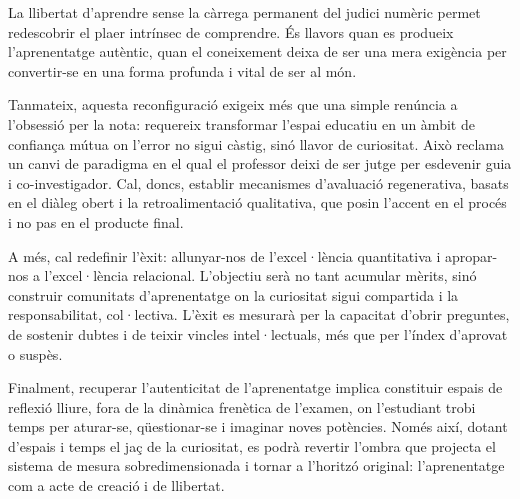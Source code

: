 La llibertat d’aprendre sense la càrrega permanent del judici numèric permet redescobrir el plaer intrínsec de comprendre. És llavors quan es produeix l’aprenentatge autèntic, quan el coneixement deixa de ser una mera exigència per convertir-se en una forma profunda i vital de ser al món.

Tanmateix, aquesta reconfiguració exigeix més que una simple renúncia a l’obsessió per la nota: requereix transformar l’espai educatiu en un àmbit de confiança mútua on l’error no sigui càstig, sinó llavor de curiositat. Això reclama un canvi de paradigma en el qual el professor deixi de ser jutge per esdevenir guia i co-investigador. Cal, doncs, establir mecanismes d’avaluació regenerativa, basats en el diàleg obert i la retroalimentació qualitativa, que posin l’accent en el procés i no pas en el producte final.

A més, cal redefinir l’èxit: allunyar-nos de l’excel·lència quantitativa i apropar-nos a l’excel·lència relacional. L’objectiu serà no tant acumular mèrits, sinó construir comunitats d’aprenentatge on la curiositat sigui compartida i la responsabilitat, col·lectiva. L’èxit es mesurarà per la capacitat d’obrir preguntes, de sostenir dubtes i de teixir vincles intel·lectuals, més que per l’índex d’aprovat o suspès.

Finalment, recuperar l’autenticitat de l’aprenentatge implica constituir espais de reflexió lliure, fora de la dinàmica frenètica de l’examen, on l’estudiant trobi temps per aturar-se, qüestionar-se i imaginar noves potències. Només així, dotant d’espais i temps el jaç de la curiositat, es podrà revertir l’ombra que projecta el sistema de mesura sobredimensionada i tornar a l’horitzó original: l’aprenentatge com a acte de creació i de llibertat.